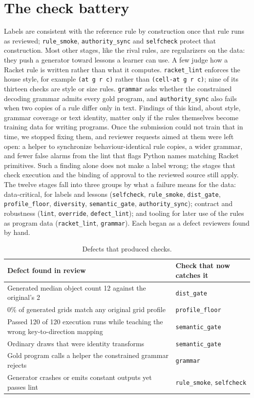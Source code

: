 \documentclass[11pt]{article}
\begin{document}
\section{The check battery}
\label{sec:battery}

Labels are consistent with the reference rule by construction once that rule
runs as reviewed;
\texttt{rule\_smoke}, \texttt{authority\_sync} and \texttt{selfcheck} protect
that construction. Most other stages, like the rival rules, are regularizers on
the data: they push a generator toward lessons a learner can use. A few judge
how a Racket rule is written rather than what it computes.
\texttt{racket\_lint} enforces the house style, for example
\texttt{(at g r c)} rather than \texttt{(cell-at g r c)}; nine of its thirteen
checks are style or size rules. \texttt{grammar} asks whether the constrained
decoding grammar admits every gold program, and \texttt{authority\_sync} also
fails when two copies of a rule differ only in text. Findings of this kind,
about style, grammar coverage or text identity, matter only if the rules
themselves become training data for writing programs. Once the submission
could not train that in time, we stopped fixing them, and
reviewer requests aimed at them were left open: a helper to synchronize
behaviour-identical rule copies, a wider grammar, and fewer false alarms from
the lint that flags Python names matching Racket primitives. Such a finding
alone does not make a label wrong; the stages that check execution and the
binding of approval to the reviewed source still apply. The twelve
stages fall into three groups by what a failure means for the data:
data-critical, for labels and lessons (\texttt{selfcheck}, \texttt{rule\_smoke},
\texttt{dist\_gate}, \texttt{profile\_floor}, \texttt{diversity},
\texttt{semantic\_\allowbreak gate}, \texttt{authority\_\allowbreak sync}); contract and
robustness (\texttt{lint}, \texttt{override}, \texttt{defect\_\allowbreak lint}); and
tooling for later use of the rules as program data (\texttt{racket\_lint},
\texttt{grammar}). Each
began as a defect reviewers found by hand.

\begin{table}[H]
\centering
\begin{tabularx}{\linewidth}{Xl}
\toprule
Defect found in review & Check that now catches it \\
\midrule
Generated median object count 12 against the original's 2 & \texttt{dist\_gate} \\
0\% of generated grids match any original grid profile & \texttt{profile\_floor} \\
Passed 120 of 120 execution runs while teaching the wrong key-to-direction mapping & \texttt{semantic\_gate} \\
Ordinary draws that were identity transforms & \texttt{semantic\_gate} \\
Gold program calls a helper the constrained grammar rejects & \texttt{grammar} \\
Generator crashes or emits constant outputs yet passes lint & \texttt{rule\_smoke}, \texttt{selfcheck} \\
\bottomrule
\end{tabularx}
\caption{Defects that produced checks.}
\end{table}
\end{document}
